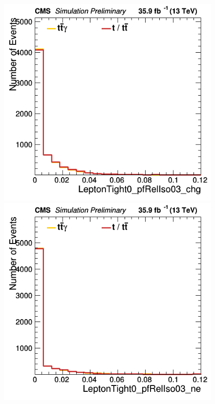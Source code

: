 \documentclass[11pt]{scrartcl}
\begin{document}
	\begin{figure}[H]
	\centering
	\begin{minipage}{.5\textwidth}
	  \centering
	  \includegraphics[width=0.7\linewidth]{figures/Notused/LeptonTight0_pfRelIso03_chg.png}
	\end{minipage}%
	\begin{minipage}{.5\textwidth}
	  \centering
	  \includegraphics[width=0.7\linewidth]{figures/Notused/LeptonTight0_pfRelIso03_ne.png}
	\end{minipage}
	\end{figure}
	
\end{document}
